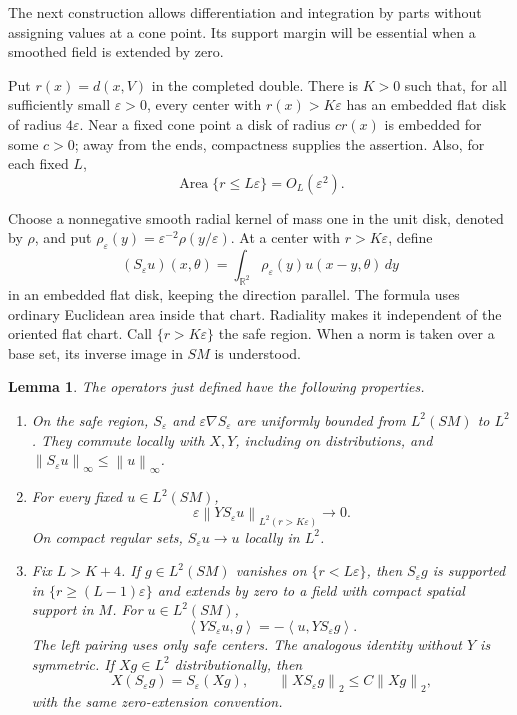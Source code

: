 \documentclass[11pt]{article}
\newtheorem{lemma}[theorem]{Lemma}
\theoremstyle{remark}
\newcommand{\eps}{\varepsilon}
\newcommand{\norm}[1]{\left\lVert#1\right\rVert}
\newcommand{\ip}[2]{\left\langle#1,#2\right\rangle}
\begin{document}
The next construction allows differentiation and integration by parts
without assigning values at a cone point. Its support margin will be
essential when a smoothed field is extended by zero.

Put \(r(x)=d(x,V)\) in the completed double. There is \(K>0\) such
that, for all sufficiently small \(\eps>0\), every center with
\(r(x)>K\eps\) has an embedded flat disk of radius \(4\eps\).
Near a fixed cone point a disk of radius \(c r(x)\) is embedded for
some \(c>0\); away from the ends, compactness supplies the assertion.
Also, for each fixed \(L\),
\begin{equation}\label{eq:area}
 \operatorname{Area}\{r\le L\eps\}=O_L(\eps^2).
\end{equation}

Choose a nonnegative smooth radial kernel of mass one in the unit disk,
denoted by \(\rho\), and put
\(\rho_\eps(y)=\eps^{-2}\rho(y/\eps)\).
At a center with \(r>K\eps\), define
\[
 (S_\eps u)(x,\theta)
   =\int_{\mathbb R^2}\rho_\eps(y)u(x-y,\theta)\,dy
\]
in an embedded flat disk, keeping the direction parallel. The formula
uses ordinary Euclidean area inside that chart. Radiality makes it
independent of the oriented flat chart. Call \(\{r>K\eps\}\) the
safe region. When a norm is taken over a base set, its inverse image
in \(SM\) is understood.

\begin{lemma}\label{lem:smoothing}
The operators just defined have the following properties.
\begin{enumerate}
\item On the safe region, \(S_\eps\) and \(\eps\nabla S_\eps\) are
uniformly bounded from \(L^2(SM)\) to \(L^2\). They commute locally
with \(X,Y\), including on distributions, and
\(\norm{S_\eps u}_\infty\le\norm{u}_\infty\).
\item For every fixed \(u\in L^2(SM)\),
\begin{equation}\label{eq:small-derivative}
 \eps\norm{Y S_\eps u}_{L^2(r>K\eps)}\longrightarrow0.
\end{equation}
On compact regular sets, \(S_\eps u\to u\) locally in \(L^2\).
\item Fix \(L>K+4\). If \(g\in L^2(SM)\) vanishes on
\(\{r<L\eps\}\), then \(S_\eps g\) is supported in
\(\{r\ge(L-1)\eps\}\) and extends by zero to a field with compact
spatial support in \(M\). For \(u\in L^2(SM)\),
\begin{equation}\label{eq:adjoint}
 \ip{Y S_\eps u}{g}=-\ip{u}{Y S_\eps g}.
\end{equation}
The left pairing uses only safe centers. The analogous identity without
\(Y\) is symmetric. If \(Xg\in L^2\) distributionally, then
\begin{equation}\label{eq:commute}
 X(S_\eps g)=S_\eps(Xg),\qquad
 \norm{X S_\eps g}_2\le C\norm{Xg}_2,
\end{equation}
with the same zero-extension convention.
\end{enumerate}
\end{lemma}
\end{document}
